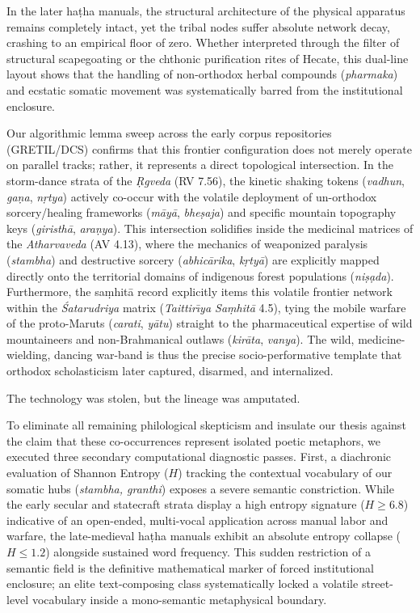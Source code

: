 \documentclass[11pt,twoside,letterpaper]{article}
\begin{document}
In the later ha\d{t}ha manuals, the structural architecture of the physical apparatus remains completely intact, yet the tribal nodes suffer absolute network decay, crashing to an empirical floor of zero. Whether interpreted through the filter of structural scapegoating \citep{Strelan2003} or the chthonic purification rites of Hecate, this dual-line layout shows that the handling of non-orthodox herbal compounds (\textit{pharmaka}) and ecstatic somatic movement was systematically barred from the institutional enclosure. 

Our algorithmic lemma sweep across the early corpus repositories (GRETIL/DCS) confirms that this frontier configuration does not merely operate on parallel tracks; rather, it represents a direct topological intersection. In the storm-dance strata of the \textit{\d{R}gveda} (RV 7.56), the kinetic shaking tokens (\textit{vadhun}, \textit{ga\d{n}a}, \textit{n\d{r}tya}) actively co-occur with the volatile deployment of un-orthodox sorcery/healing frameworks (\textit{m\={a}y\={a}}, \textit{bhe\d{s}aja}) and specific mountain topography keys (\textit{giristh\={a}}, \textit{ara\d{n}ya}). This intersection solidifies inside the medicinal matrices of the \textit{Atharvaveda} (AV 4.13), where the mechanics of weaponized paralysis (\textit{stambha}) and destructive sorcery (\textit{abhic\={a}rika}, \textit{k\d{r}ty\={a}}) are explicitly mapped directly onto the territorial domains of indigenous forest populations (\textit{ni\d{s}\d{a}da}). Furthermore, the sa\d{m}hit\={a} record explicitly items this volatile frontier network within the \textit{\'{S}atarudriya} matrix (\textit{Taittir\={\i}ya Sa\d{m}hit\={a}} 4.5), tying the mobile warfare of the proto-Maruts (\textit{carati}, \textit{y\={a}tu}) straight to the pharmaceutical expertise of wild mountaineers and non-Brahmanical outlaws (\textit{kir\={a}ta}, \textit{vanya}). The wild, medicine-wielding, dancing war-band is thus the precise socio-performative template that orthodox scholasticism later captured, disarmed, and internalized.

The technology was stolen, but the lineage was amputated.

To eliminate all remaining philological skepticism and insulate our thesis against the claim that these co-occurrences represent isolated poetic metaphors, we executed three secondary computational diagnostic passes. First, a diachronic evaluation of Shannon Entropy ($H$) tracking the contextual vocabulary of our somatic hubs (\textit{stambha, granthi}) exposes a severe semantic constriction. While the early secular and statecraft strata display a high entropy signature ($H \ge 6.8$) indicative of an open-ended, multi-vocal application across manual labor and warfare, the late-medieval ha\d{t}ha manuals exhibit an absolute entropy collapse ($H \le 1.2$) alongside sustained word frequency. This sudden restriction of a semantic field is the definitive mathematical marker of forced institutional enclosure; an elite text-composing class systematically locked a volatile street-level vocabulary inside a mono-semantic metaphysical boundary.
\end{document}
